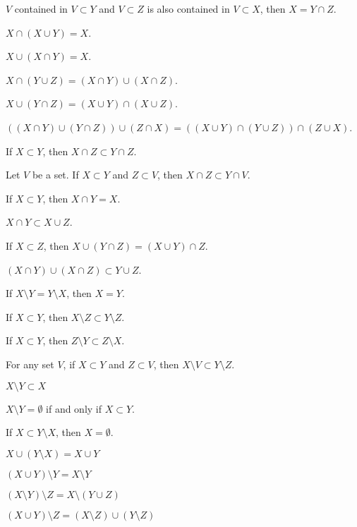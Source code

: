 \begin{thm}
  $V$ contained in $V\subset Y$ and $V\subset Z$ is also contained in
  $V\subset X$, then $X=Y\cap Z$.
\item\label{xboole1:21} $X\cap(X\cup Y)=X$.
\item\label{xboole1:22} $X\cup(X\cap Y)=X$.
\item\label{xboole1:23} $X\cap(Y\cup Z)=(X\cap Y)\cup (X\cap Z)$.
\item\label{xboole1:24} $X\cup(Y\cap Z)=(X\cup Y)\cap(X\cup Z)$.
\item\label{xboole1:25} $((X \cap Y) \cup (Y \cap Z)) \cup (Z \cap X) = ((X \cup Y) \cap (Y \cup Z)) \cap (Z \cup X)$.
\item\label{xboole1:26} If $X\subset Y$, then $X\cap Z\subset Y\cap Z$.
\item\label{xboole1:27} Let $V$ be a set. If $X\subset Y$ and $Z\subset V$,
  then $X\cap Z\subset Y\cap V$.
\item\label{xboole1:28} If $X\subset Y$, then $X\cap Y=X$.
\item\label{xboole1:29} $X\cap Y\subset X\cup Z$.
\item\label{xboole1:30} If $X\subset Z$, then $X \cup (Y \cap Z) = (X \cup Y) \cap Z$.
\item\label{xboole1:31} $(X \cap Y) \cup (X \cap Z) \subset Y \cup Z$.
\item\label{xboole1:32} If $X\setminus Y=Y\setminus X$, then $X=Y$.
\item\label{xboole1:33} If $X\subset Y$, then $X\setminus Z\subset Y\setminus Z$.
\item\label{xboole1:34} If $X\subset Y$, then $Z\setminus Y\subset Z\setminus X$.
\item\label{xboole1:35} For any set $V$, if $X\subset Y$ and $Z\subset V$,
  then $X\setminus V\subset Y\setminus Z$.
\item\label{xboole1:36} $X\setminus Y\subset X$
\item\label{xboole1:37} $X\setminus Y=\emptyset$ if and only if
  $X\subset Y$.
\item\label{xboole1:38} If $X\subset Y\setminus X$, then $X=\emptyset$.
\item\label{xboole1:39} $X \cup (Y \setminus X) = X \cup Y$
\item\label{xboole1:40} $(X \cup Y) \setminus Y = X \setminus Y$
\item\label{xboole1:41} $(X \setminus Y) \setminus Z = X \setminus (Y \cup Z)$
\item\label{xboole1:42} $(X \cup Y) \setminus Z = (X \setminus Z) \cup (Y \setminus Z)$

\end{thm}
